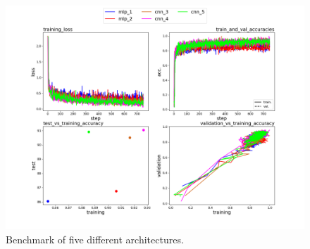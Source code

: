 \documentclass{assignment}
\begin{document}
\begin{figure}[htbp!]
    \centering
    \includegraphics[width=1\textwidth]{figures/q3_results.png}
    \caption{Benchmark of five different architectures.}
    \label{Q3}
\end{figure}
\end{document}
